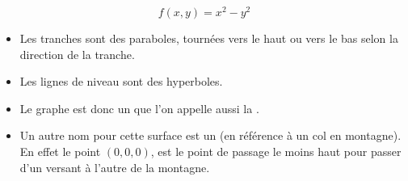 \begin{exemple}{}{}
	$$f(x,y) = x^2-y^2$$
	
	
	\begin{itemize}
		\item Les tranches sont des paraboles, tournées vers le haut ou vers le bas selon la direction de la tranche.
		\item Les lignes de niveau sont des hyperboles.
		\item Le graphe est donc un  que l'on appelle aussi la .
		\item Un autre nom pour cette surface est un  (en référence à un col en montagne). 
		En effet le point $(0,0,0)$, est le point de passage le moins haut pour passer d'un versant à l'autre de la montagne. 
	\end{itemize}
	

\end{exemple}
